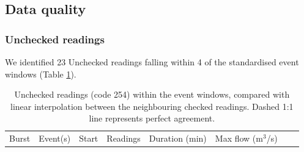 \documentclass[
  11pt,
  a4paper]{article}
\begin{document}
\subsection{Data quality}\label{data-quality}

\subsubsection{Unchecked readings}\label{unchecked-readings}

We identified 23 Unchecked readings falling within 4 of the standardised event windows (Table \ref{tab:uncheckeddata}).

\begingroup
\scriptsize
\setlength{\tabcolsep}{3pt}

\begin{longtable}[]{@{}
  >{\raggedright\arraybackslash}p{}
  >{\raggedright\arraybackslash}p{}
  >{\raggedleft\arraybackslash}p{}
  >{\raggedleft\arraybackslash}p{}
  >{\raggedleft\arraybackslash}p{}
  >{\raggedleft\arraybackslash}p{}
  >{\raggedleft\arraybackslash}p{}
  >{\raggedleft\arraybackslash}p{}@{}}
\caption{\label{tab:uncheckeddata}Unchecked readings (code 254) within the event windows, compared with linear interpolation between the neighbouring checked readings. Dashed 1:1 line represents perfect agreement.}\tabularnewline
\toprule\noalign{}
\begin{minipage}[b]{\linewidth}\raggedright
Burst
\end{minipage} & \begin{minipage}[b]{\linewidth}\raggedright
Event(s)
\end{minipage} & \begin{minipage}[b]{\linewidth}\raggedleft
Start
\end{minipage} & \begin{minipage}[b]{\linewidth}\raggedleft
Readings
\end{minipage} & \begin{minipage}[b]{\linewidth}\raggedleft
Duration (min)
\end{minipage} & \begin{minipage}[b]{\linewidth}\raggedleft
Max flow (m\(^3\)/s)
\end{minipage} & \begin{minipage}[b]{\linewidth}\raggedleft

\end{minipage}
\end{longtable}
\end{document}
